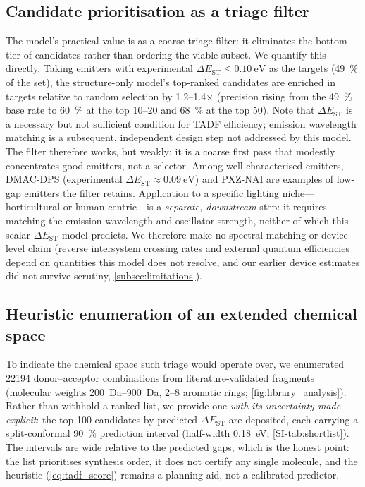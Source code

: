 \subsection{Candidate prioritisation as a triage filter}\label{subsec:candidates}

The model's practical value is as a coarse triage filter: it eliminates the bottom
tier of candidates rather than ordering the viable subset. We quantify this directly. Taking emitters with experimental
$\Delta E_\text{ST}\le\qty{0.10}{\electronvolt}$ as the targets (\qty{49}{\percent}
of the set), the structure-only model's top-ranked candidates are enriched in
targets relative to random selection by \numrange{1.2}{1.4}$\times$
(precision rising from the \qty{49}{\percent} base rate to \qty{60}{\percent} at
the top \num{10}--\num{20} and \qty{68}{\percent} at the top \num{50}).
Note that $\Delta E_\text{ST}$ is a necessary but not sufficient condition for TADF
efficiency; emission wavelength matching is a subsequent, independent design step
not addressed by this model.
The filter therefore works, but weakly: it is a coarse
first pass that modestly concentrates good emitters, not a selector.
Among well-characterised emitters, DMAC-DPS
(experimental $\Delta E_\text{ST}\approx\qty{0.09}{\electronvolt}$) and PXZ-NAI are
examples of low-gap emitters the filter retains.
Application to a specific lighting niche---horticultural or human-centric---is a
\emph{separate, downstream} step: it requires matching the emission wavelength and
oscillator strength, neither of which this scalar $\Delta E_\text{ST}$ model predicts.
We therefore make no spectral-matching or device-level claim (reverse intersystem
crossing rates and external quantum efficiencies depend on quantities this model does
not resolve, and our earlier device estimates did not survive scrutiny,
\cref{subsec:limitations}).

\subsection{Heuristic enumeration of an extended chemical space}\label{subsec:library}

To indicate the chemical space such triage would operate over, we enumerated
\num{22194} donor--acceptor combinations from literature-validated fragments
(molecular weights \qtyrange{200}{900}{\dalton}, \numrange{2}{8} aromatic rings;
\cref{fig:library_analysis}). Rather than withhold a ranked list, we provide one
\emph{with its uncertainty made explicit}: the top \num{100} candidates by predicted
$\Delta E_\text{ST}$ are deposited, each carrying a split-conformal
\qty{90}{\percent} prediction interval (half-width \qty{0.18}{\electronvolt};
\cref{SI-tab:shortlist}). The intervals are wide relative to the predicted gaps, which
is the honest point: the list prioritises synthesis order, it does not certify any
single molecule, and the heuristic (\cref{eq:tadf_score}) remains a planning aid, not a
calibrated predictor.

